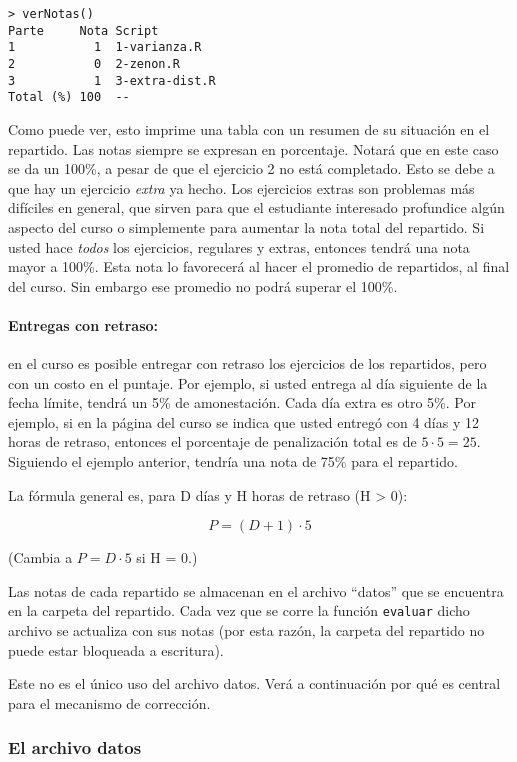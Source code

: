 \documentclass[]{article}
\begin{document}
\begin{verbatim}
> verNotas()
Parte     Nota Script        
1           1  1-varianza.R  
2           0  2-zenon.R     
3           1  3-extra-dist.R
Total (%) 100  --       
\end{verbatim}
Como puede ver, esto imprime una tabla con un resumen de su situación en
el repartido. Las notas siempre se expresan en porcentaje. Notará que en
este caso se da un 100\%, a pesar de que el ejercicio 2 no está
completado. Esto se debe a que hay un ejercicio \emph{extra} ya hecho.
Los ejercicios extras son problemas más difíciles en general, que sirven
para que el estudiante interesado profundice algún aspecto del curso o
simplemente para aumentar la nota total del repartido. Si usted hace
\emph{todos} los ejercicios, regulares y extras, entonces tendrá una
nota mayor a 100\%. Esta nota lo favorecerá al hacer el promedio de
repartidos, al final del curso. Sin embargo ese promedio no podrá
superar el 100\%.

\paragraph{Entregas con retraso:}

en el curso es posible entregar con retraso los ejercicios de los
repartidos, pero con un costo en el puntaje. Por ejemplo, si usted
entrega al día siguiente de la fecha límite, tendrá un 5\% de
amonestación. Cada día extra es otro 5\%. Por ejemplo, si en la página
del curso se indica que usted entregó con 4 días y 12 horas de retraso,
entonces el porcentaje de penalización total es de $5 \cdot 5 = 25$.
Siguiendo el ejemplo anterior, tendría una nota de 75\% para el
repartido.

La fórmula general es, para D días y H horas de retraso (H
\textgreater{} 0):

\[
  P = (D + 1) \cdot 5
\]

(Cambia a $P = D \cdot 5$ si H = 0.)

Las notas de cada repartido se almacenan en el archivo ``datos'' que se
encuentra en la carpeta del repartido. Cada vez que se corre la función
\texttt{evaluar} dicho archivo se actualiza con sus notas (por esta
razón, la carpeta del repartido no puede estar bloqueada a escritura).

Este no es el único uso del archivo datos. Verá a continuación por qué
es central para el mecanismo de corrección.

\subsubsection{El archivo datos}
\end{document}
